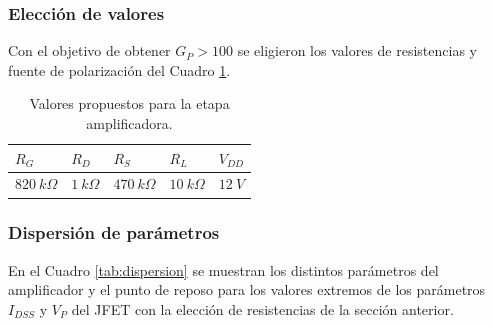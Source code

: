         \subsubsection{Elección de valores}

        Con el objetivo de obtener $G_P > 100$ se eligieron los valores de resistencias y fuente de polarización del Cuadro \ref{tab:valores}.

        \begin{table}[h]
        \centering
        \begin{tabularx}{0.7\textwidth}{XXXXX}
        \hline
         $R_G$  		& $R_D$ 		& $R_S$ 			& $R_L$ 		& $V_{DD}$ \\
         \hline
         $820\ k\Omega$ & $1\ k\Omega$ 	& $470\ k\Omega$ 	& $10\ k\Omega$ & $12\ V$ \\
        \hline
        \end{tabularx}
        \caption{Valores propuestos para la etapa amplificadora.}
        \label{tab:valores}
        \end{table}



        \subsubsection{Dispersión de parámetros}

        En el Cuadro \ref{tab:dispersion} se muestran los distintos parámetros del amplificador y el punto de reposo para los valores extremos de los parámetros $I_{DSS}$ y $V_P$ del JFET con la elección de resistencias de la sección anterior.



